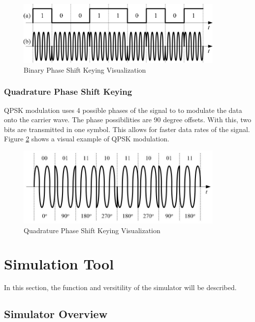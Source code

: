 \documentclass[12pt]{report}
\begin{document}
\begin{figure}[h]
    \centering
    \includegraphics[width=4.0in]{Example-of-BPSK-modulation-format-a-binary-signal-and-b-BPSK-modulated-signal.png}
    \caption{Binary Phase Shift Keying Visualization \cite{mahdirajiAdvancedModulationFormats2010} }
    \label{fig:BPSKsig}
\end{figure}
\subsection{Quadrature Phase Shift Keying}

QPSK modulation uses 4 possible phases of the signal to to modulate the data onto the carrier wave. The phase possibilities are 90 degree offsets. With this, two bits are transmitted in one symbol. This allows for faster data rates of the signal. Figure \ref{fig:QPSKmod} shows a visual example of QPSK modulation.

\begin{figure}[h]
    \centering
    \includegraphics[width=4.0in]{QPSK_sig.JPG}
    \caption{Quadrature Phase Shift Keying Visualization \cite{mahdirajiAdvancedModulationFormats2010} }
    \label{fig:QPSKmod}
\end{figure}


\chapter {Simulation Tool}
In this section, the function and versitility of the simulator will be described.

\section{Simulator Overview}
\end{document}
